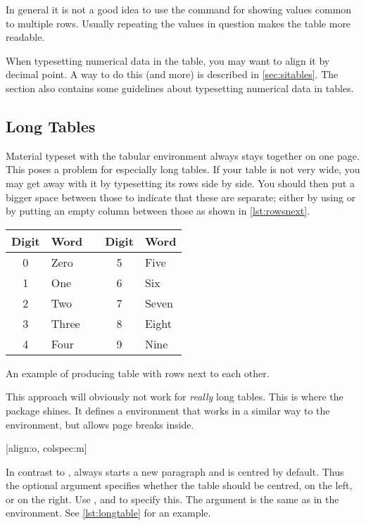In general it is not a good idea to use the  command for showing
values common to multiple rows. Usually repeating the values in question makes
the table more readable.

When typesetting numerical data in the table, you may want to align it by
decimal point. A way to do this (and more) is described in
\autoref{sec:sitables}. The section also contains some guidelines about
typesetting numerical data in tables.

\subsection{Long Tables}

Material typeset with the tabular environment always stays together on one
page. This poses a problem for especially long tables. If your table is not
very wide, you may get away with it by typesetting its rows side by side. You
should then put a bigger space between those to indicate that these are
separate; either by using  or by putting an empty column between
those as shown in \autoref{lst:rowsnext}.
\begin{listing}
  \begin{example}[vertical_mode, examplewidth=0.6\linewidth]
\begin{tabular}{@{}cllcl@{}}
  \toprule
  Digit & Word  && Digit & Word  \\
  \midrule
  0     & Zero  && 5     & Five  \\
  1     & One   && 6     & Six   \\
  2     & Two   && 7     & Seven \\
  3     & Three && 8     & Eight \\
  4     & Four  && 9     & Nine  \\
  \bottomrule
\end{tabular}
\end{example}
  \caption{An example of producing table with rows next to each other.}\label{lst:rowsnext}
\end{listing}

This approach will obviously not work for \emph{really} long tables. This is
where the  package shines. It defines a 
environment that works in a similar way to the  environment, but
allows page breaks inside.

\begin{lscommand}
  [align:o, colspec:m]
\end{lscommand}
In contrast to ,  always starts a new paragraph
and is centred by default. Thus the optional argument  specifies
whether the table should be centred, on the left, or on the right. Use
,  and  to specify this. The  argument
is the same as in the  environment. See \autoref{lst:longtable}
for an example.

